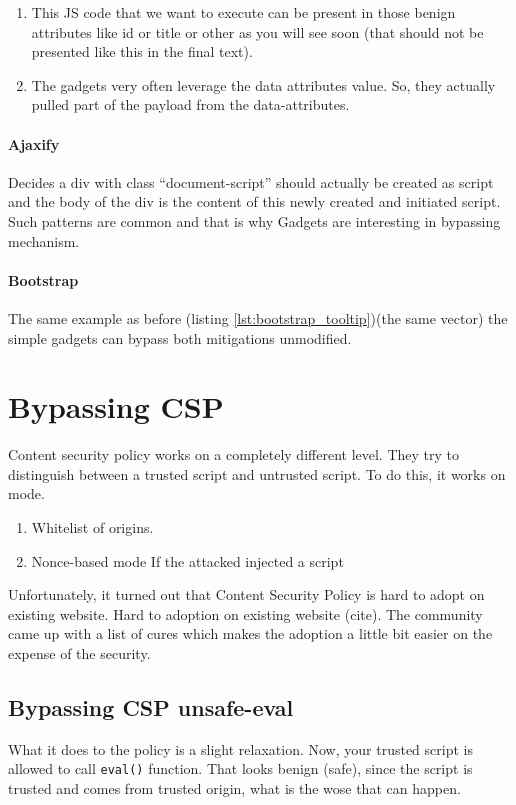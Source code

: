 \begin{enumerate}
	\item This JS code that we want to execute can be present in those benign attributes like id or title or other as you will see soon (that should not be presented like this in the final text).
	\item The gadgets very often leverage the data attributes value. So, they actually pulled part of the payload from the data-attributes. 
\end{enumerate}

\paragraph{Ajaxify}
Decides a div with class “document-script” should actually be created as script and the body of the div is the content of this newly created and initiated script. Such patterns are common and that is why Gadgets are interesting in bypassing mechanism. 



\paragraph{Bootstrap}
The same example as before (listing \ref{lst:bootstrap_tooltip})(the same vector) the simple gadgets can bypass both mitigations unmodified. 

\section{Bypassing CSP}
Content security policy works on a completely different level. They try to distinguish between a trusted script and untrusted script. To do this, it works on mode. 
	 
\begin{enumerate}
	\item Whitelist of origins.
	\item Nonce-based mode If the attacked injected a script 
\end{enumerate}

Unfortunately, it turned out that Content Security Policy is hard to adopt on existing website. Hard to adoption on existing website (cite). The community came up with a list of cures which makes the adoption a little bit easier on the expense of the security. 
\subsection{Bypassing CSP unsafe-eval} What it does to the policy is a slight relaxation. Now, your trusted script is allowed to call \verb|eval()| function. That looks benign  (safe), since the script is trusted and comes from trusted origin, what is the wose that can happen.

